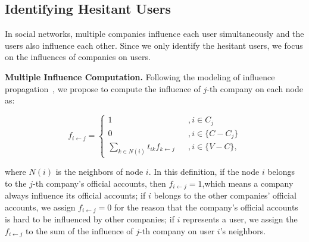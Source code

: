 \documentclass{llncs}
\begin{document}
\vspace*{-0.5cm}
\subsection{Identifying Hesitant Users}
\vspace*{-0.3cm}

In social networks, multiple companies influence each user simultaneously and the users also influence each other. Since we only identify the hesitant users, we focus on the influences of companies on users.

\textbf{Multiple Influence Computation. }
Following the modeling of influence propagation~\cite{ijcai13biaoxiang}, we propose to compute the influence of $j$-th company on each node as:

\vspace*{-0.25cm}
\begin{small}{
\begin{equation}\label{eq:def}
    f_{i\leftarrow j} = \left\{
        \begin{array}{lcl}
            1       &      & {, i \in C_{j}}\\
            0     &      & {, i \in \{C-C_{j}\}}\\
            \sum  _{k\in N(i)} t_{ik} f_{k \leftarrow j}   &      & {, i \in \{V-C\}},
        \end{array}
    \right.
\end{equation}
}\end{small}
\vspace*{-0.25cm}

\noindent
where $N(i)$ is the neighbors of node $i$. In this definition, if the node $i$ belongs to the $j$-th company's official accounts, then $f_{i\leftarrow j} = 1$,which means a company always influence its official accounts; if $i$ belongs to the other companies' official accounts, we assign $f_{i\leftarrow j} = 0$ for the reason that the company's official accounts is hard to be influenced by other companies; if $i$ represents a user, we assign the $f_{i\leftarrow j}$ to the sum of the influence of $j$-th company  on user $i$'s neighbors.
\end{document}
